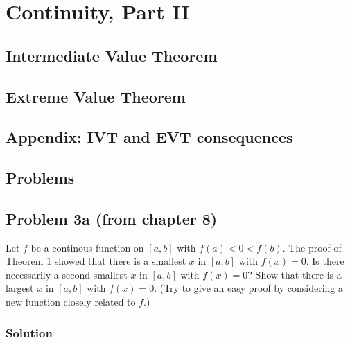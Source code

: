 \section{Continuity, Part II}

\subsection{Intermediate Value Theorem} \label{ivt}
\subsection{Extreme Value Theorem}
\subsection{Appendix: IVT and EVT consequences}
\subsection{Problems}
\subsection*{Problem 3a (from chapter 8)}
Let $f$ be a continous function on $[a, b]$ with $f(a)<0<f(b)$. The
proof of Theorem 1 showed that there is a smallest $x$ in $[a,b]$ with
$f(x)=0$. Is there necessarily a second smallest $x$ in $[a,b]$ with
$f(x)=0$? Show that there is a largest $x$ in $[a,b]$ with $f(x)=0$.
(Try to give an easy proof by considering a new function closely
related to $f$.)

\subsubsection*{Solution}



